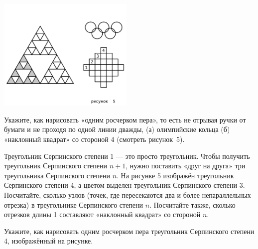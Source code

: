 ﻿

\begin{enumerate}
\itA \ \\ \vspace{-1.65cm}
\begin{center}
	\includegraphics[width=6.5cm]{stats/2018/images/serpinsky}
\end{center}

Укажите, как нарисовать «одним росчерком пера», то есть не отрывая ручки от бумаги и не проходя по одной линии дважды, (а) олимпийские кольца (б) «наклонный квадрат» со стороной 4 (смотреть рисунок~5).

\itB Треугольник Серпинского степени 1 — это просто треугольник. Чтобы получить треугольник Серпинского степени $n+1$, нужно поставить «друг на друга» три треугольника Серпинского степени $n$. На рисунке 5 изображён треугольник Серпинского степени 4, а цветом выделен треугольник Серпинского степени 3. Посчитайте, сколько узлов (точек, где пересекаются два и более непараллельных отрезка) в треугольнике Серпинского степени $n$. Посчитайте также, сколько отрезков длины 1 составляют «наклонный квадрат» со стороной $n$.

\itC Укажите, как нарисовать одним росчерком пера треугольник Серпинского степени 4, изображённый на рисунке.
\end{enumerate}